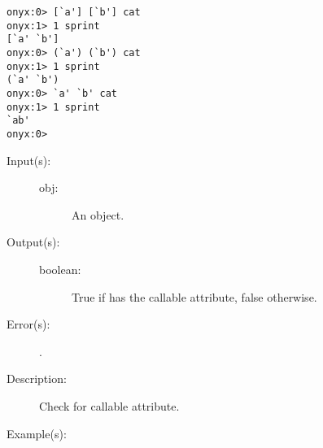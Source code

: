 \begin{description}
\begin{description}
\begin{verbatim}
onyx:0> [`a'] [`b'] cat
onyx:1> 1 sprint
[`a' `b']
onyx:0> (`a') (`b') cat
onyx:1> 1 sprint
(`a' `b')
onyx:0> `a' `b' cat
onyx:1> 1 sprint
`ab'
onyx:0>
		\end{verbatim}
	\end{description}
\label{systemdict:ccheck}
\item[{\onyxop{obj}{ccheck}{boolean}}: ]
	\begin{description}\item[]
	\item[Input(s): ]
		\begin{description}\item[]
		\item[obj: ]
			An object.
		\end{description}
	\item[Output(s): ]
		\begin{description}\item[]
		\item[boolean: ]
			True if  has the callable attribute, false
			otherwise.
		\end{description}
	\item[Error(s): ]
		\begin{description}\item[]
		\item[.]
		\end{description}
	\item[Description: ]
		Check  for callable attribute.
	\item[Example(s): ]\begin{verbatim}


\end{verbatim}
\end{description}
\end{description}
